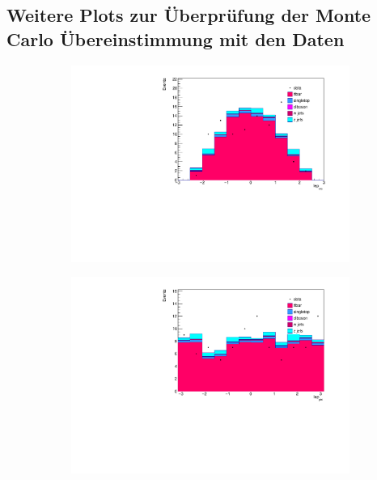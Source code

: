 \subsection{Weitere Plots zur Überprüfung der Monte Carlo Übereinstimmung mit den 
Daten}
\label{sec:stackedrest}


\begin{figure}[h]
  \begin{subfigure}{0.5\textwidth}
    \centering
    \includegraphics[width=\linewidth]{plots_and_txt/stacked_plots/stacked_lep_eta.pdf}
    \caption{}
    \label{fig:stacked_lep_pt2}
  \end{subfigure}%
  \begin{subfigure}{0.5\textwidth}
    \centering
    \includegraphics[width=\linewidth]{plots_and_txt/stacked_plots/stacked_lep_phi.pdf}

\end{subfigure}
\end{figure}

